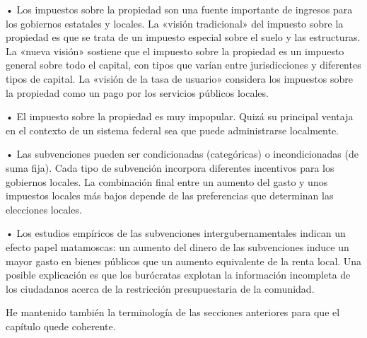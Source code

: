 \documentclass[10pt,a4paper]{article}
\begin{document}
• Los impuestos sobre la propiedad son una fuente importante de ingresos para los gobiernos estatales y locales. La «visión tradicional» del impuesto sobre la propiedad es que se trata de un impuesto especial sobre el suelo y las estructuras. La «nueva visión» sostiene que el impuesto sobre la propiedad es un impuesto general sobre todo el capital, con tipos que varían entre jurisdicciones y diferentes tipos de capital. La «visión de la tasa de usuario» considera los impuestos sobre la propiedad como un pago por los servicios públicos locales.

• El impuesto sobre la propiedad es muy impopular. Quizá su principal ventaja en el contexto de un sistema federal sea que puede administrarse localmente.

• Las subvenciones pueden ser condicionadas (categóricas) o incondicionadas (de suma fija). Cada tipo de subvención incorpora diferentes incentivos para los gobiernos locales. La combinación final entre un aumento del gasto y unos impuestos locales más bajos depende de las preferencias que determinan las elecciones locales.

• Los estudios empíricos de las subvenciones intergubernamentales indican un efecto papel matamoscas: un aumento del dinero de las subvenciones induce un mayor gasto en bienes públicos que un aumento equivalente de la renta local. Una posible explicación es que los burócratas explotan la información incompleta de los ciudadanos acerca de la restricción presupuestaria de la comunidad.

He mantenido también la terminología de las secciones anteriores para que el capítulo quede coherente.





\clearpage
\end{document}
